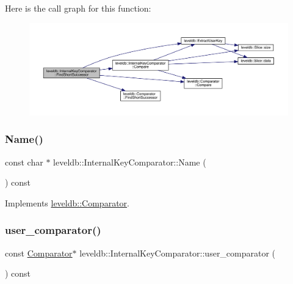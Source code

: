 Here is the call graph for this function\+:
\nopagebreak
\begin{figure}[H]
\begin{center}
\leavevmode
\includegraphics[width=350pt]{classleveldb_1_1_internal_key_comparator_a221a28a524474834b2cba5c3be84cb13_cgraph}
\end{center}
\end{figure}
\mbox{\label{classleveldb_1_1_internal_key_comparator_ae8848b098c0c20071aa93a166b80de0d}} 
\subsubsection{\texorpdfstring{Name()}{Name()}}
{\footnotesize\ttfamily const char $\ast$ leveldb\+::\+Internal\+Key\+Comparator\+::\+Name (\begin{DoxyParamCaption}{ }\end{DoxyParamCaption}) const\hspace{0.3cm}{\ttfamily [virtual]}}



Implements \mbox{\hyperlink{structleveldb_1_1_comparator_a888b039bdd6d59517dca75fb40721f5e}{leveldb\+::\+Comparator}}.

\mbox{\label{classleveldb_1_1_internal_key_comparator_ac8c5db699e5defed74c6b17ddadf90f8}} 
\subsubsection{\texorpdfstring{user\_comparator()}{user\_comparator()}}
{\footnotesize\ttfamily const \mbox{\hyperlink{structleveldb_1_1_comparator}{Comparator}}$\ast$ leveldb\+::\+Internal\+Key\+Comparator\+::user\+\_\+comparator (\begin{DoxyParamCaption}{ }\end{DoxyParamCaption}) const\hspace{0.3cm}{\ttfamily [inline]}}

